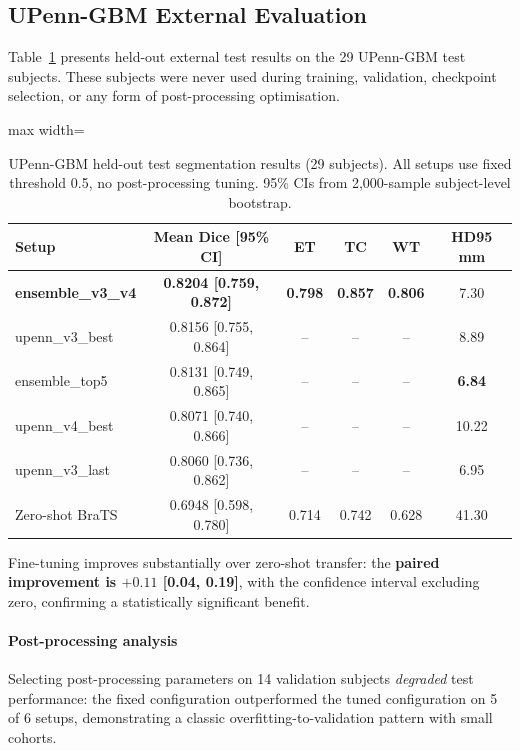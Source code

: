 \documentclass[conference]{IEEEtran}
\begin{document}
\subsection{UPenn-GBM External Evaluation}
\label{sec:upenn_results}

Table~\ref{tab:upenn_seg} presents held-out external test results on the 29 UPenn-GBM test subjects. These subjects were never used during training, validation, checkpoint selection, or any form of post-processing optimisation.

\begin{table}[!t]
\centering
\caption{UPenn-GBM held-out test segmentation results (29 subjects). All setups use fixed threshold 0.5, no post-processing tuning. 95\% CIs from 2,000-sample subject-level bootstrap.}
\label{tab:upenn_seg}
\begin{adjustbox}{max width=\columnwidth}
\begin{tabular}{lccccc}
\toprule
\textbf{Setup} & \textbf{Mean Dice [95\% CI]} & \textbf{ET} & \textbf{TC} & \textbf{WT} & \textbf{HD95 mm} \\
\midrule
\textbf{ensemble\_v3\_v4} & \textbf{0.8204 [0.759, 0.872]} & \textbf{0.798} & \textbf{0.857} & \textbf{0.806} & 7.30 \\
upenn\_v3\_best & 0.8156 [0.755, 0.864] & -- & -- & -- & 8.89 \\
ensemble\_top5 & 0.8131 [0.749, 0.865] & -- & -- & -- & \textbf{6.84} \\
upenn\_v4\_best & 0.8071 [0.740, 0.866] & -- & -- & -- & 10.22 \\
upenn\_v3\_last & 0.8060 [0.736, 0.862] & -- & -- & -- & 6.95 \\
\midrule
Zero-shot BraTS & 0.6948 [0.598, 0.780] & 0.714 & 0.742 & 0.628 & 41.30 \\
\bottomrule
\end{tabular}
\end{adjustbox}
\end{table}

Fine-tuning improves substantially over zero-shot transfer: the \textbf{paired improvement is $+0.11$ [0.04, 0.19]}, with the confidence interval excluding zero, confirming a statistically significant benefit.

\paragraph{Post-processing analysis} Selecting post-processing parameters on 14 validation subjects \textit{degraded} test performance: the fixed configuration outperformed the tuned configuration on 5 of 6 setups, demonstrating a classic overfitting-to-validation pattern with small cohorts.
\end{document}
